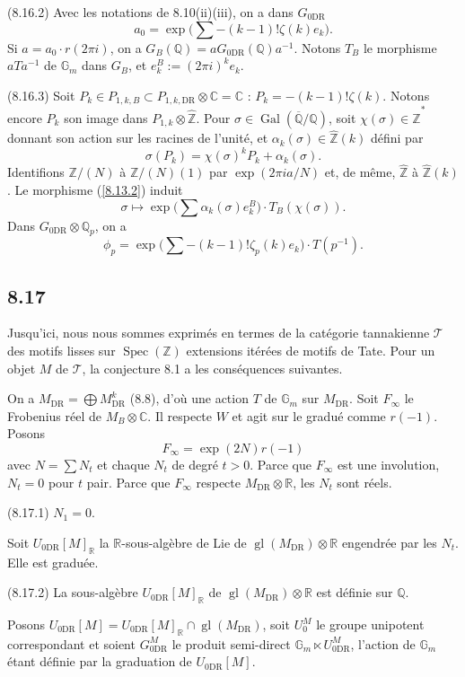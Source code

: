 \documentclass[12pt,a4paper]{article}
\theoremstyle{plain}
\theoremstyle{definition}
\theoremstyle{remark}
\DeclareMathOperator{\Spec}{Spec}
\DeclareMathOperator{\Gal}{Gal}
\DeclareMathOperator{\gl}{gl}
\newcommand{\Gm}{\mathbb{G}_m}
\newcommand{\Q}{\mathbb{Q}}
\newcommand{\Z}{\mathbb{Z}}
\newcommand{\C}{\mathbb{C}}
\newcommand{\R}{\mathbb{R}}
\newcommand{\DR}{\mathrm{DR}}
\begin{document}
(8.16.2) Avec les notations de 8.10(ii)(iii), on a dans $G_{0\DR}$
$$a_0 = \exp\Big(\sum -(k-1)!\zeta(k) e_k\Big).$$
Si $a = a_0 \cdot r(2\pi i)$, on a $G_B(\Q) = a G_{0\DR}(\Q) a^{-1}$. Notons $T_B$ le morphisme $aTa^{-1}$ de $\Gm$ dans $G_B$, et $e_k^B := (2\pi i)^k e_k$.

(8.16.3) Soit $P_k \in P_{1,k,B} \subset P_{1,k,\DR} \otimes \C = \C$ : $P_k = -(k-1)!\zeta(k)$. Notons encore $P_k$ son image dans $P_{1,k} \otimes \hat{\Z}$. Pour $\sigma \in \Gal(\overline{\Q}/\Q)$, soit $\chi(\sigma) \in \hat{\Z}^*$ donnant son action sur les racines de l'unit\'e, et $\alpha_k(\sigma) \in \hat{\Z}(k)$ d\'efini par
$$\sigma(P_k) = \chi(\sigma)^k P_k + \alpha_k(\sigma).$$
Identifions $\Z/(N)$ \`a $\Z/(N)(1)$ par $\exp(2\pi i a/N)$ et, de m\^eme, $\hat{\Z}$ \`a $\hat{\Z}(k)$. Le morphisme (\ref{8.13.2}) induit
\begin{equation}\label{8.16.4}
\sigma \longmapsto \exp\Big(\sum \alpha_k(\sigma) e_k^B\Big) \cdot T_B(\chi(\sigma)). \tag{8.16.4}
\end{equation}
Dans $G_{0\DR} \otimes \Q_p$, on a
$$\phi_p = \exp\Big(\sum -(k-1)!\zeta_p(k) e_k\Big) \cdot T(p^{-1}).$$

\subsection*{8.17}

Jusqu'ici, nous nous sommes exprim\'es en termes de la cat\'egorie tannakienne $\mathcal{T}$ des motifs lisses sur $\Spec(\Z)$ extensions it\'er\'ees de motifs de Tate. Pour un objet $M$ de $\mathcal{T}$, la conjecture 8.1 a les cons\'equences suivantes.

On a $M_{\DR} = \bigoplus M_{\DR}^k$ (8.8), d'o\`u une action $T$ de $\Gm$ sur $M_{\DR}$. Soit $F_\infty$ le Frobenius r\'eel de $M_B \otimes \C$. Il respecte $W$ et agit sur le gradu\'e comme $r(-1)$. Posons
$$F_\infty = \exp(2N)r(-1)$$
avec $N = \sum N_t$ et chaque $N_t$ de degr\'e $t > 0$. Parce que $F_\infty$ est une involution, $N_t = 0$ pour $t$ pair. Parce que $F_\infty$ respecte $M_{\DR} \otimes \R$, les $N_t$ sont r\'eels.

(8.17.1) $N_1 = 0$.

Soit $U_{0\DR}[M]_\R$ la $\R$-sous-alg\`ebre de Lie de $\gl(M_{\DR}) \otimes \R$ engendr\'ee par les $N_t$. Elle est gradu\'ee.

(8.17.2) La sous-alg\`ebre $U_{0\DR}[M]_\R$ de $\gl(M_{\DR}) \otimes \R$ est d\'efinie sur $\Q$.

Posons $U_{0\DR}[M] = U_{0\DR}[M]_\R \cap \gl(M_{\DR})$, soit $U_0^M$ le groupe unipotent correspondant et soient $G_{0\DR}^M$ le produit semi-direct $\Gm \ltimes U_{0\DR}^M$, l'action de $\Gm$ \'etant d\'efinie par la graduation de $U_{0\DR}[M]$.
\end{document}
